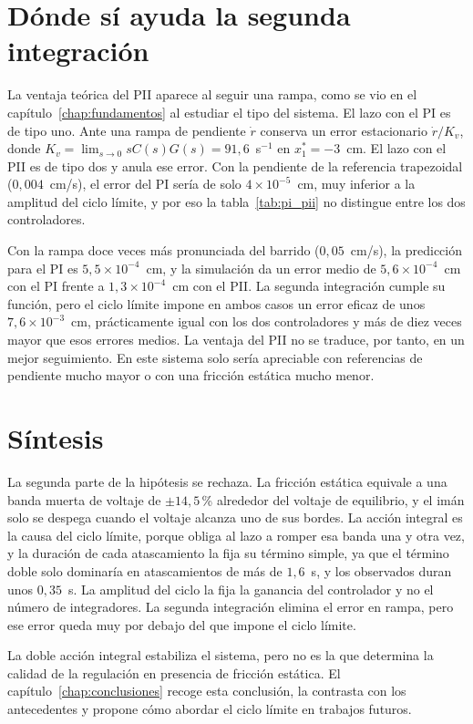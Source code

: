 \section{Dónde sí ayuda la segunda integración}\label{sec:ventaja_rampa}

La ventaja teórica del PII aparece al seguir una rampa, como se vio en el capítulo~\ref{chap:fundamentos} al estudiar el tipo del sistema. El lazo con el PI es de tipo uno. Ante una rampa de pendiente $\dot r$ conserva un error estacionario $\dot r/K_v$, donde $K_v=\lim_{s\to0} sC(s)G(s)=91{,}6$~s$^{-1}$ en $x_1^*=-3$~cm. El lazo con el PII es de tipo dos y anula ese error. Con la pendiente de la referencia trapezoidal ($0{,}004$~cm/s), el error del PI sería de solo $4\times10^{-5}$~cm, muy inferior a la amplitud del ciclo límite, y por eso la tabla~\ref{tab:pi_pii} no distingue entre los dos controladores.

Con la rampa doce veces más pronunciada del barrido ($0{,}05$~cm/s), la predicción para el PI es $5{,}5\times10^{-4}$~cm, y la simulación da un error medio de $5{,}6\times10^{-4}$~cm con el PI frente a $1{,}3\times10^{-4}$~cm con el PII. La segunda integración cumple su función, pero el ciclo límite impone en ambos casos un error eficaz de unos $7{,}6\times10^{-3}$~cm, prácticamente igual con los dos controladores y más de diez veces mayor que esos errores medios. La ventaja del PII no se traduce, por tanto, en un mejor seguimiento. En este sistema solo sería apreciable con referencias de pendiente mucho mayor o con una fricción estática mucho menor.

\section{Síntesis}\label{sec:sintesis_doble_integral}

La segunda parte de la hipótesis se rechaza. La fricción estática equivale a una banda muerta de voltaje de $\pm14{,}5$\,\% alrededor del voltaje de equilibrio, y el imán solo se despega cuando el voltaje alcanza uno de sus bordes. La acción integral es la causa del ciclo límite, porque obliga al lazo a romper esa banda una y otra vez, y la duración de cada atascamiento la fija su término simple, ya que el término doble solo dominaría en atascamientos de más de $1{,}6$~s, y los observados duran unos $0{,}35$~s. La amplitud del ciclo la fija la ganancia del controlador y no el número de integradores. La segunda integración elimina el error en rampa, pero ese error queda muy por debajo del que impone el ciclo límite.

La doble acción integral estabiliza el sistema, pero no es la que determina la calidad de la regulación en presencia de fricción estática. El capítulo~\ref{chap:conclusiones} recoge esta conclusión, la contrasta con los antecedentes y propone cómo abordar el ciclo límite en trabajos futuros.

\FloatBarrier
